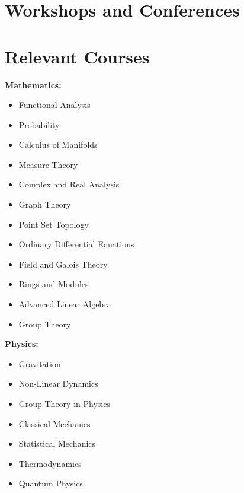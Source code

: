 \documentclass[11pt,a4paper,sans]{moderncv}
\begin{document}
\section{Workshops and Conferences}
\vspace{4mm}

\section{Relevant Courses}
\begin{minipage}[t]{0.45\textwidth}
    \textbf{Mathematics:}
    \begin{itemize}
        \item Functional Analysis
        \item Probability
        \item Calculus of Manifolds
        \item Measure Theory
        \item Complex and Real Analysis
        \item Graph Theory
        \item Point Set Topology
        \item Ordinary Differential Equations
        \item Field and Galois Theory
        \item Rings and Modules
        \item Advanced Linear Algebra
        \item Group Theory
    \end{itemize}
\end{minipage}\hfill
\begin{minipage}[t]{0.45\textwidth}
    \textbf{Physics:}
    \begin{itemize}
        \item Gravitation
        \item Non-Linear Dynamics
        \item Group Theory in Physics
        \item Classical Mechanics
        \item Statistical Mechanics
        \item Thermodynamics
        \item Quantum Physics
    \end{itemize}
\end{minipage}
\vspace{4mm}
\end{document}
